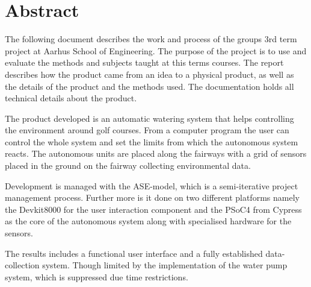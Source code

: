 \chapter*{Abstract}

The following document describes the work and process of the groups 3rd term project at Aarhus School of Engineering. The purpose of the project is to use and evaluate the methods and subjects taught at this terms courses. The report describes how the product came from an idea to a physical product, as well as the details of the product and the methods used. The documentation holds all technical details about the product.

The product developed is an automatic watering system that helps controlling the environment around golf courses. From a computer program the user can control the whole system and set the limits from which the autonomous system reacts. The autonomous units are placed along the fairways with a grid of sensors placed in the ground on the fairway collecting environmental data.

Development is managed with the ASE-model, which is a semi-iterative project management process. Further more is it done on two different platforms namely the Devkit8000 for the user interaction component and the PSoC4 from Cypress as the core of the autonomous system along with specialised hardware for the sensors.

The results includes a functional user interface and a fully established data-collection system. Though limited by the implementation of the water pump system, which is suppressed due time restrictions.

\afterpage{\null\newpage} %